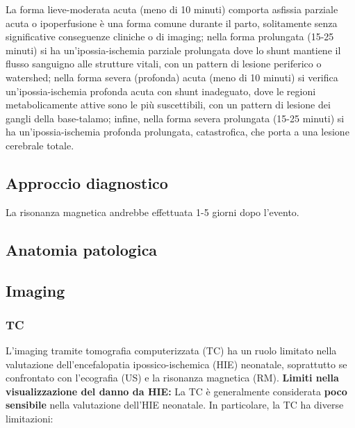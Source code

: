 La forma lieve-moderata acuta (meno di 10 minuti) comporta asfissia parziale acuta o ipoperfusione è una forma comune durante il parto, solitamente senza significative conseguenze cliniche o di imaging; nella forma prolungata (15-25 minuti) si ha un'ipossia-ischemia parziale prolungata dove lo shunt mantiene il flusso sanguigno alle strutture vitali, con un pattern di lesione periferico o watershed; nella forma severa (profonda) acuta (meno di 10 minuti) si verifica un'ipossia-ischemia profonda acuta con shunt inadeguato, dove le regioni metabolicamente attive sono le più suscettibili, con un pattern di lesione dei gangli della base-talamo; infine, nella forma severa prolungata (15-25 minuti) si ha un'ipossia-ischemia profonda prolungata, catastrofica, che porta a una lesione cerebrale totale.

\subsection{Approccio diagnostico}

La risonanza magnetica andrebbe effettuata 1-5 giorni dopo l'evento.

\subsection{Anatomia patologica}

\subsection{Imaging}

\subsubsection{TC}

L'imaging tramite tomografia computerizzata (TC) ha un ruolo limitato nella valutazione dell'encefalopatia ipossico-ischemica (HIE) neonatale, soprattutto se confrontato con l'ecografia (US) e la risonanza magnetica (RM).
\textbf{Limiti nella visualizzazione del danno da HIE:} La TC è generalmente considerata \textbf{poco sensibile} nella valutazione dell'HIE neonatale. In particolare, la TC ha diverse limitazioni:

